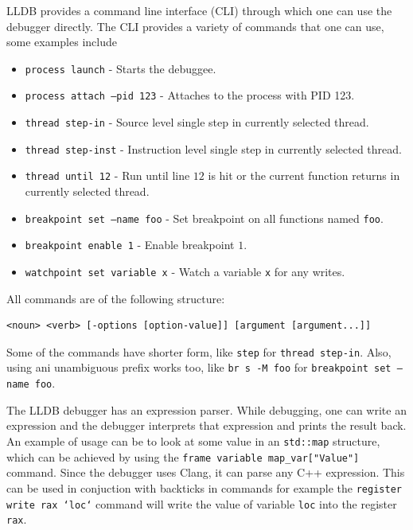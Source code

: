 LLDB provides a command line interface (CLI) through which one can use the debugger
directly. The CLI provides a variety of commands that one can use, some examples include
\begin{itemize}
    \item \texttt{process launch} - Starts the debuggee.
    \item \texttt{process attach --pid 123} - Attaches to the process with PID
        123.
    \item \texttt{thread step-in} - Source level single step in currently selected thread.
    \item \texttt{thread step-inst} - Instruction level single step in currently selected thread.
    \item \texttt{thread until 12} - Run until line $12$ is hit or the current
        function returns in currently selected thread.
    \item \texttt{breakpoint set --name foo} - Set breakpoint on all functions
        named \texttt{foo}.
    \item \texttt{breakpoint enable 1} - Enable breakpoint $1$.
    \item \texttt{watchpoint set variable x} - Watch a variable \texttt{x} for
        any writes.
\end{itemize}
All commands are of the following structure:
\begin{lstlisting}
<noun> <verb> [-options [option-value]] [argument [argument...]]
\end{lstlisting}
Some of the commands have shorter form, like \texttt{step} for \texttt{thread
step-in}. Also, using ani unambiguous prefix works too, like \texttt{br s -M
foo} for \texttt{breakpoint set --name foo}.

The LLDB debugger has an expression parser. While debugging, one can write an
expression and the debugger interprets that expression and prints the result
back. An example of usage can be to look at some value in an \texttt{std::map}
structure, which can be achieved by using the \texttt{frame variable
map\_var["Value"]} command. Since the debugger uses Clang, it can parse
any C++ expression. This can be used in conjuction with backticks in commands
for example the \texttt{register write rax `loc`} command will write the
value of variable \texttt{loc} into the register \texttt{rax}.


